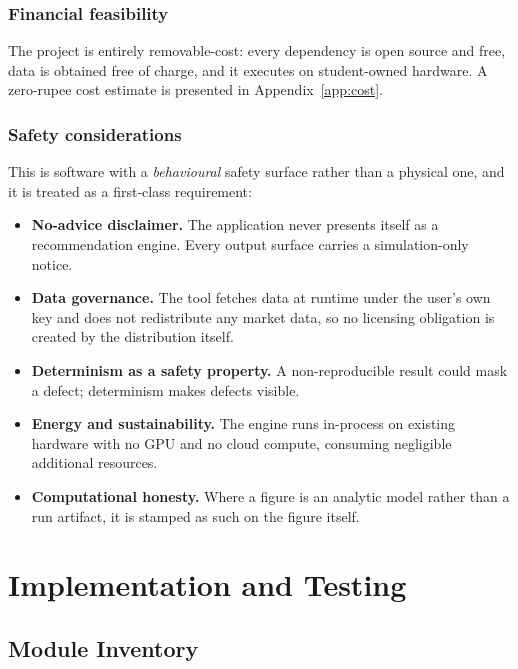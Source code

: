 \documentclass[12pt,a4paper,oneside]{report}
\begin{document}
\subsection{Financial feasibility}

The project is entirely removable-cost: every dependency is open source and free,
data is obtained free of charge, and it executes on student-owned hardware. A
zero-rupee cost estimate is presented in Appendix~\ref{app:cost}.

\subsection{Safety considerations}

This is software with a \emph{behavioural} safety surface rather than a physical
one, and it is treated as a first-class requirement:

\begin{itemize}[leftmargin=1.5cm]
    \item \textbf{No-advice disclaimer.} The application never presents itself as
    a recommendation engine. Every output surface carries a simulation-only
    notice.
    \item \textbf{Data governance.} The tool fetches data at runtime under the
    user's own key and does not redistribute any market data, so no licensing
    obligation is created by the distribution itself.
    \item \textbf{Determinism as a safety property.} A non-reproducible result
    could mask a defect; determinism makes defects visible.
    \item \textbf{Energy and sustainability.} The engine runs in-process on
    existing hardware with no GPU and no cloud compute, consuming negligible
    additional resources.
    \item \textbf{Computational honesty.} Where a figure is an analytic model
    rather than a run artifact, it is stamped as such on the figure itself.
\end{itemize}

\chapter{Implementation and Testing}\label{sec:impl}

\section{Module Inventory}
\end{document}
